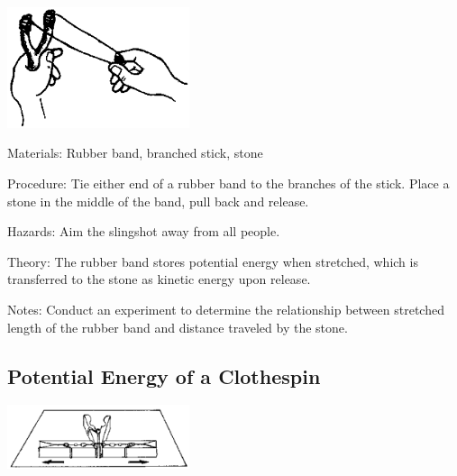 \begin{multicols}{2}
\begin{center}
\includegraphics[width=0.4\textwidth]{./img/source/slingshot.png}
\end{center}

\begin{description*}
\item[Materials:]{Rubber band, branched stick, stone}
\item[Procedure:]{Tie either end of a rubber band to the branches of the stick. Place a stone in the middle of the band, pull back and release.}
\item[Hazards:]{Aim the slingshot away from all people.}
\item[Theory:]{The rubber band stores potential energy when stretched, which is transferred to the stone as kinetic energy upon release.}
\item[Notes:]{Conduct an experiment to determine the relationship between stretched length of the rubber band and distance traveled by the stone.}
\end{description*}

\subsection{Potential Energy of a Clothespin}

\begin{center}
\includegraphics[width=0.4\textwidth]{./img/source/energy-clothespin.png}
\end{center}


\end{multicols}
